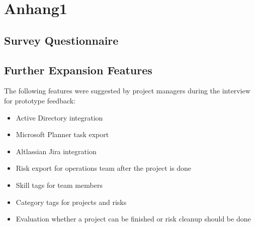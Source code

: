 \chapter{Anhang1}
\label{ch:app-A}

\section{Survey Questionnaire}
\label{appTBD}

\section{Further Expansion Features}
\label{appTBD2}
The following features were suggested by project managers during the interview for prototype feedback:
\begin{itemize}
	\item Active Directory integration
	\item Microsoft Planner task export
	\item Altlassian Jira integration
	\item Risk export for operations team after the project is done
	\item Skill tags for team members
	\item Category tags for projects and risks
	\item Evaluation whether a project can be finished or risk cleanup should be done
\end{itemize}

